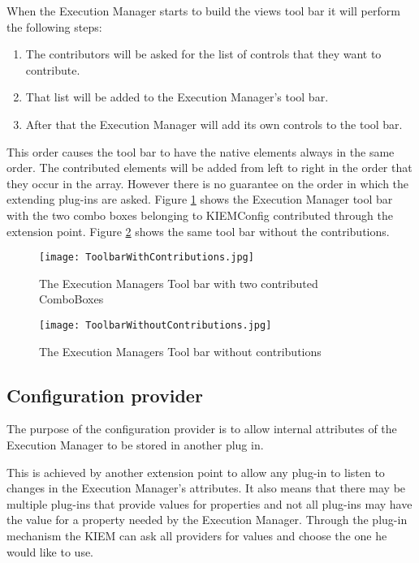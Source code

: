 When the Execution Manager starts to build the views tool bar it will perform the following steps:
\begin{enumerate}
 \item The contributors will be asked for the list of controls that they want to contribute.
 \item That list will be added to the Execution Manager's tool bar.
 \item After that the Execution Manager will add its own controls to the tool bar.
\end{enumerate}
This order causes the tool bar to have the native elements always in the same order.
The contributed elements will be added from left to right in the order that they occur in the array. However there
is no guarantee on the order in which the extending plug-ins are asked.
Figure \ref{fig:ToolbarWithContributions} shows the Execution Manager tool bar with the two combo boxes belonging to \ac{KIEMConfig}
contributed through the extension point. Figure \ref{fig:ToolbarWithoutContributions} shows the same tool bar without
the contributions.
\begin{figure}[ToolbarWithContributions]
  \centering
  \texttt{[image: ToolbarWithContributions.jpg]}
  \caption[The Execution Managers Tool bar with two contributed ComboBoxes]%
  {The Execution Managers Tool bar with two contributed ComboBoxes\protect}
  \label{fig:ToolbarWithContributions}
\end{figure}
\begin{figure}[ToolbarWithoutContributions]
  \centering
  \texttt{[image: ToolbarWithoutContributions.jpg]}
  \caption[The Execution Managers Tool bar without contributions]%
  {The Execution Managers Tool bar without contributions\protect}
  \label{fig:ToolbarWithoutContributions}
\end{figure}

\subsection{Configuration provider}
\label{section:ConfigurationProvider}
The purpose of the configuration provider is to allow internal attributes of the
Execution Manager to be stored in another plug in. 

This is achieved by another extension point to allow any plug-in to listen to changes
in the Execution Manager's attributes. It also means that there may be multiple
plug-ins that provide values for properties and not all plug-ins may have the value for
a property needed by the Execution Manager. Through the plug-in mechanism the \ac{KIEM}
can ask all providers for values and choose the one he would like to use.

